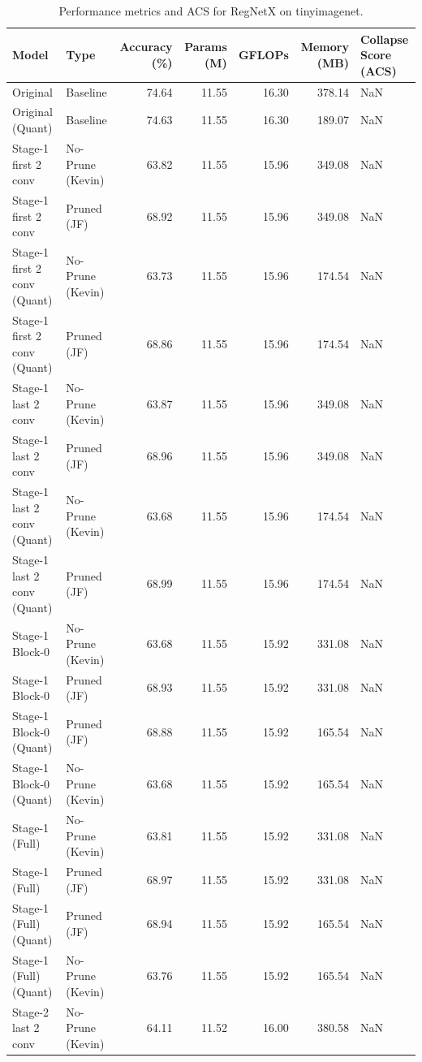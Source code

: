 \begin{table}
\caption{Performance metrics and ACS for RegNetX on tinyimagenet.}
\label{tab:RegNetX_tinyimagenet}
\begin{tabular}{llrrrrl}
\toprule
Model & Type & Accuracy (\%) & Params (M) & GFLOPs & Memory (MB) & Collapse Score (ACS) \\
\midrule
Original & Baseline & 74.64 & 11.55 & 16.30 & 378.14 & NaN \\
Original
(Quant) & Baseline & 74.63 & 11.55 & 16.30 & 189.07 & NaN \\
Stage-1 first 2 conv & No-Prune (Kevin) & 63.82 & 11.55 & 15.96 & 349.08 & NaN \\
Stage-1 first 2 conv & Pruned (JF) & 68.92 & 11.55 & 15.96 & 349.08 & NaN \\
Stage-1 first 2 conv
(Quant) & No-Prune (Kevin) & 63.73 & 11.55 & 15.96 & 174.54 & NaN \\
Stage-1 first 2 conv
(Quant) & Pruned (JF) & 68.86 & 11.55 & 15.96 & 174.54 & NaN \\
Stage-1 last 2 conv & No-Prune (Kevin) & 63.87 & 11.55 & 15.96 & 349.08 & NaN \\
Stage-1 last 2 conv & Pruned (JF) & 68.96 & 11.55 & 15.96 & 349.08 & NaN \\
Stage-1 last 2 conv
(Quant) & No-Prune (Kevin) & 63.68 & 11.55 & 15.96 & 174.54 & NaN \\
Stage-1 last 2 conv
(Quant) & Pruned (JF) & 68.99 & 11.55 & 15.96 & 174.54 & NaN \\
Stage-1 Block-0 & No-Prune (Kevin) & 63.68 & 11.55 & 15.92 & 331.08 & NaN \\
Stage-1 Block-0 & Pruned (JF) & 68.93 & 11.55 & 15.92 & 331.08 & NaN \\
Stage-1 Block-0
(Quant) & Pruned (JF) & 68.88 & 11.55 & 15.92 & 165.54 & NaN \\
Stage-1 Block-0
(Quant) & No-Prune (Kevin) & 63.68 & 11.55 & 15.92 & 165.54 & NaN \\
Stage-1 (Full) & No-Prune (Kevin) & 63.81 & 11.55 & 15.92 & 331.08 & NaN \\
Stage-1 (Full) & Pruned (JF) & 68.97 & 11.55 & 15.92 & 331.08 & NaN \\
Stage-1 (Full)
(Quant) & Pruned (JF) & 68.94 & 11.55 & 15.92 & 165.54 & NaN \\
Stage-1 (Full)
(Quant) & No-Prune (Kevin) & 63.76 & 11.55 & 15.92 & 165.54 & NaN \\
Stage-2 last 2 conv & No-Prune (Kevin) & 64.11 & 11.52 & 16.00 & 380.58 & NaN \\

\end{tabular}
\end{table}
